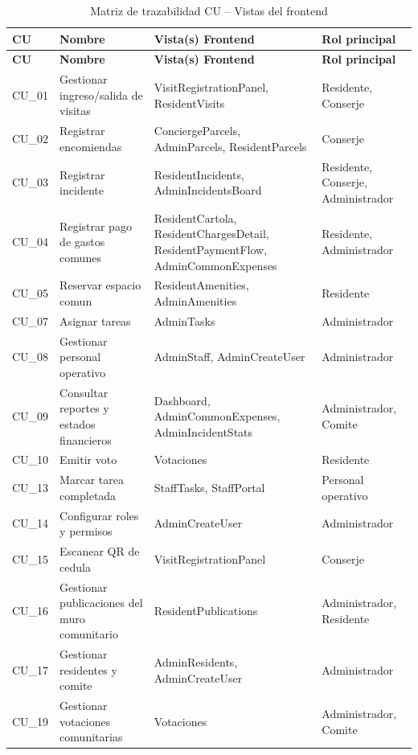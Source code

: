 \begin{longtable}{|p{}|p{}|p{}|p{}|}
\caption{Matriz de trazabilidad CU -- Vistas del frontend}\label{tab:traza-cu-vistas}\\
\hline
\textbf{CU} & \textbf{Nombre} & \textbf{Vista(s) Frontend} & \textbf{Rol principal} \\
\hline
\endfirsthead
\hline
\textbf{CU} & \textbf{Nombre} & \textbf{Vista(s) Frontend} & \textbf{Rol principal} \\
\hline
\endhead
\hline
\endfoot

CU\_01 & Gestionar ingreso/salida de visitas & VisitRegistrationPanel, ResidentVisits & Residente, Conserje \\
\hline
CU\_02 & Registrar encomiendas & ConciergeParcels, AdminParcels, ResidentParcels & Conserje \\
\hline
CU\_03 & Registrar incidente & ResidentIncidents, AdminIncidentsBoard & Residente, Conserje, Administrador \\
\hline
CU\_04 & Registrar pago de gastos comunes & ResidentCartola, ResidentChargesDetail, ResidentPaymentFlow, AdminCommonExpenses & Residente, Administrador \\
\hline
CU\_05 & Reservar espacio comun & ResidentAmenities, AdminAmenities & Residente \\
\hline
CU\_07 & Asignar tareas & AdminTasks & Administrador \\
\hline
CU\_08 & Gestionar personal operativo & AdminStaff, AdminCreateUser & Administrador \\
\hline
CU\_09 & Consultar reportes y estados financieros & Dashboard, AdminCommonExpenses, AdminIncidentStats & Administrador, Comite \\
\hline
CU\_10 & Emitir voto & Votaciones & Residente \\
\hline
CU\_13 & Marcar tarea completada & StaffTasks, StaffPortal & Personal operativo \\
\hline
CU\_14 & Configurar roles y permisos & AdminCreateUser & Administrador \\
\hline
CU\_15 & Escanear QR de cedula & VisitRegistrationPanel & Conserje \\
\hline
CU\_16 & Gestionar publicaciones del muro comunitario & ResidentPublications & Administrador, Residente \\
\hline
CU\_17 & Gestionar residentes y comite & AdminResidents, AdminCreateUser & Administrador \\
\hline
CU\_19 & Gestionar votaciones comunitarias & Votaciones & Administrador, Comite \\

\end{longtable}
